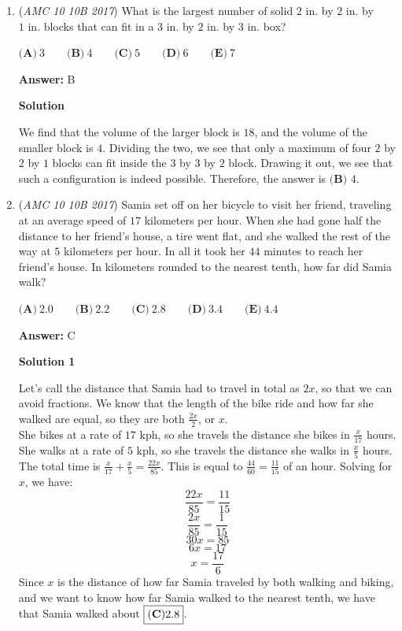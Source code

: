 \begin{enumerate}
 


	\item (\textit{AMC 10 10B 2017}) What is the largest number of solid $2\text{ in.}$ by $2\text{ in.}$ by $1\text{ in.}$ blocks that can fit in a $3\text{ in.}$ by $2\text{ in.}$ by $3\text{ in.}$ box?


 $\textbf{(A)}\ 3\qquad\textbf{(B)}\ 4\qquad\textbf{(C)}\ 5\qquad\textbf{(D)}\ 6\qquad\textbf{(E)}\ 7$

 \textbf{Answer: }B



\textbf{Solution}

We find that the volume of the larger block is $18$, and the volume of the smaller block is $4$. Dividing the two, we see that only a maximum of four $2$ by $2$ by $1$ blocks can fit inside the $3$ by $3$ by $2$ block. Drawing it out, we see that such a configuration is indeed possible. Therefore, the answer is $\boxed{\textbf{(B) }4}$.

 


	\item (\textit{AMC 10 10B 2017}) Samia set off on her bicycle to visit her friend, traveling at an average speed of $17$ kilometers per hour. When she had gone half the distance to her friend's house, a tire went flat, and she walked the rest of the way at $5$ kilometers per hour. In all it took her $44$ minutes to reach her friend's house. In kilometers rounded to the nearest tenth, how far did Samia walk?


 $\textbf{(A)}\ 2.0\qquad\textbf{(B)}\ 2.2\qquad\textbf{(C)}\ 2.8\qquad\textbf{(D)}\ 3.4\qquad\textbf{(E)}\ 4.4$

 \textbf{Answer: }C



\textbf{Solution 1}

Let's call the distance that Samia had to travel in total as $2x$, so that we can avoid fractions. We know that the length of the bike ride and how far she walked are equal, so they are both $\frac{2x}{2}$, or $x$.
 \[\]She bikes at a rate of $17$ kph, so she travels the distance she bikes in $\frac{x}{17}$ hours. She walks at a rate of $5$ kph, so she travels the distance she walks in $\frac{x}{5}$ hours.
 \[\]The total time is $\frac{x}{17}+\frac{x}{5} = \frac{22x}{85}$. This is equal to $\frac{44}{60} = \frac{11}{15}$ of an hour. Solving for $x$, we have:
 \[\]
 \[\frac{22x}{85} = \frac{11}{15}\]
 \[\frac{2x}{85} = \frac{1}{15}\]
 \[30x = 85\]
 \[6x = 17\]
 \[x = \frac{17}{6}\]
 \[\]Since $x$ is the distance of how far Samia traveled by both walking and biking, and we want to know how far Samia walked to the nearest tenth, we have that Samia walked about $\boxed{\bold{(C)} 2.8}$.


\end{enumerate}
